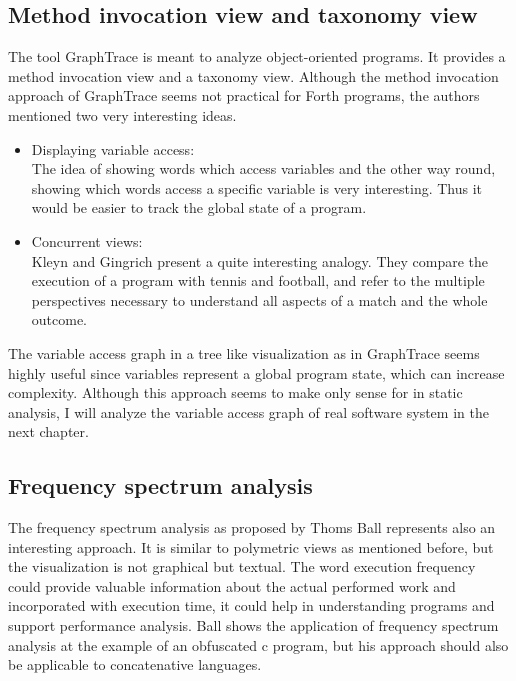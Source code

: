 \subsection*{Method invocation view and taxonomy view}
The tool \gls{GraphTrace}\cite{Kleyn:1988:GOS:62084.62101} is meant to analyze object-oriented programs. It provides a method invocation view and a taxonomy view. Although the method invocation approach of GraphTrace seems not practical for Forth programs, the authors mentioned two very interesting ideas.
\begin{itemize}
\item Displaying variable access:\\
	The idea of showing words which access variables and the other way round, showing which words access a specific variable is very interesting. Thus it would be easier to track the global state of a program.
\item Concurrent views:\\
	Kleyn and Gingrich\cite{Kleyn:1988:GOS:62084.62101} present a quite interesting analogy. They compare the execution of a program with tennis and football, and refer to the multiple perspectives necessary to understand all aspects of a match and the whole outcome.
\end{itemize}

The variable access graph in a tree like visualization as in GraphTrace seems highly useful since variables represent a global program state, which can increase complexity. Although this approach seems to make only sense for in static analysis, I will analyze the variable access graph of real software system in the next chapter.

\subsection*{Frequency spectrum analysis}

The frequency spectrum analysis as proposed by Thoms Ball\cite{Ball:1999:CDA:318774.318944} represents also an interesting approach. It is similar to polymetric views as mentioned before, but the visualization is not graphical but textual. The word execution frequency could provide valuable information about the actual performed work and incorporated with execution time, it could help in understanding programs and support performance analysis. Ball shows the application of frequency spectrum analysis at the example of an obfuscated c program\cite{Ball:1999:CDA:318774.318944}, but his approach should also be applicable to concatenative languages.

